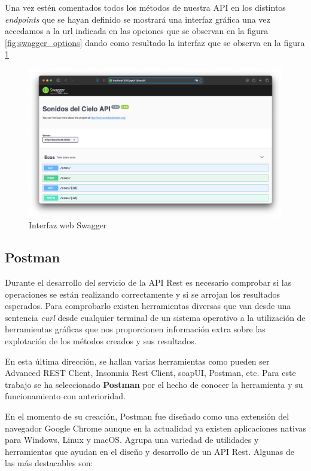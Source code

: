 Una vez estén comentados todos los métodos de nuestra API en los distintos \textit{endpoints} que se hayan definido se mostrará una interfaz gráfica una vez accedamos a la url indicada en las opciones que se observan en la figura \ref{fig:swagger_options} dando como resultado la interfaz que se observa en la figura \ref{fig:swagger_ui}

\begin{figure}[H]
    \centering
    \includegraphics[width=\textwidth]{include/capturas/SwaggerUI.png}
    \caption{Interfaz web Swagger}
    \label{fig:swagger_ui}
\end{figure}

\subsection{Postman}
Durante el desarrollo del servicio de la API Rest es necesario comprobar si las operaciones se están realizando correctamente y si se arrojan los resultados esperados. Para comprobarlo existen herramientas diversas que van desde una sentencia \textit{curl} desde cualquier terminal de un sistema operativo a la utilización de herramientas gráficas que nos proporcionen información extra sobre las explotación de los métodos creados y sus resultados. 

En esta última dirección, se hallan varias herramientas como pueden ser Advanced REST Client, Insomnia Rest Client, soapUI, Postman, etc. Para este trabajo se ha seleccionado \textbf{Postman} por el hecho de conocer la herramienta y su funcionamiento con anterioridad.

En el momento de su creación, Postman fue diseñado como una extensión del navegador Google Chrome aunque en la actualidad ya existen aplicaciones nativas para Windows, Linux y macOS. Agrupa una variedad de utilidades y herramientas que ayudan en el diseño y desarrollo de un API Rest. Algunas de las más destacables son:

